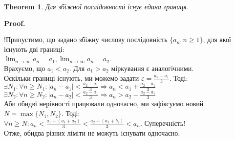 \documentclass[a4paper, 14pt]{article}
\makeatletter
\def\qed{$\blacksquare$}
\theoremstyle{theoremdd}
\newtheorem{theorem}{Theorem}[subsection]
\theoremstyle{theoremdd}
\theoremstyle{theoremdd}
\theoremstyle{theoremdd}
\theoremstyle{theoremdd}
\theoremstyle{theoremdd}
\theoremstyle{theoremdd}
\theoremstyle{theoremdd}
\renewenvironment{proof}[1][Proof.\\]{\par
\pushQED{\hfill \qed}%
\normalfont \topsep6\p@\@plus6\p@\relax
\trivlist
\item\relax
{\bfseries
#1\@addpunct{.}}\hspace\labelsep\ignorespaces
}{%
\popQED\endtrivlist\@endpefalse
}
\makeatother
\begin{document}
	\begin{theorem}
	Для збіжної послідовності існує єдина границя.
	\end{theorem}
	
	\begin{proof}
	!Припустимо, що задано збіжну числову послідовність $\{a_n, n \geq 1\}$, для якої існують дві границі:\\
	$\displaystyle \lim_{n \to \infty} a_n = a_1, \lim_{n \to \infty} a_n = a_2$.\\
	Врахуємо, що $a_1<a_2$. Для $a_1>a_2$ міркування є аналогічними.\\
	Оскільки границі існують, ми можемо задати $\displaystyle \varepsilon = \frac{a_2-a_1}{3}$. Тоді:\\
	$\displaystyle \exists N_1: \forall n \geq N_1: |a_n-a_1|< \frac{a_2-a_1}{3} \Rightarrow a_n < a_1 + \frac{a_2-a_1}{3}$\\
	$\displaystyle \exists N_2: \forall n \geq N_2: |a_n-a_2|< \frac{a_2-a_1}{3} \Rightarrow a_n > a_2 - \frac{a_2-a_1}{3}$\\
	Аби обидві нерівності працювали одночасно, ми зафіксуємо новий $N= \max\{N_1,N_2\}$. Тоді:\\
	$\displaystyle \forall n \geq N: a_n < \frac{a_1+(a_1+a_2)}{3} < \frac{a_2+(a_1+b_2)}{3}<a_n$. Суперечність! \\ 
	Отже, обидва різних ліміти не можуть існувати одночасно.
	\end{proof}
	
\end{document}

